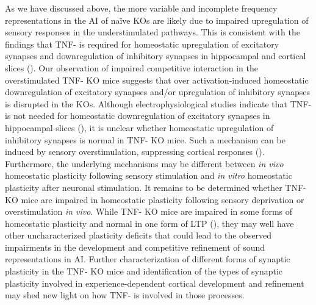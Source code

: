 As we have discussed above, the more variable and incomplete frequency representations in the AI of na\"ive KOs are likely due to impaired upregulation of sensory responses in the understimulated pathways. This is consistent with the findings that TNF-\textalpha{} is required for homeostatic upregulation of excitatory synapses and downregulation of inhibitory synapses in hippocampal and cortical slices (\cite{Stellwagen2006, Kaneko2008}). Our observation of impaired competitive interaction in the overstimulated TNF-\textalpha{} KO mice suggests that over activation-induced homeostatic downregulation of excitatory synapses and/or upregulation of inhibitory synapses is disrupted in the KOs. Although electrophysiological studies indicate that TNF-\textalpha{} is not needed for homeostatic downregulation of excitatory synapses in hippocampal slices (\cite{Stellwagen2006}), it is unclear whether homeostatic upregulation of inhibitory synapses is normal in TNF-\textalpha{} KO mice. Such a mechanism can be induced by sensory overstimulation, suppressing cortical responses (\cite{Knott2002}). Furthermore, the underlying mechanisms may be different between \textit{in vivo} homeostatic plasticity following sensory stimulation and \textit{in vitro} homeostatic plasticity after neuronal stimulation. It remains to be determined whether TNF-\textalpha{} KO mice are impaired in homeostatic plasticity following sensory deprivation or overstimulation \textit{in vivo}. While TNF-\textalpha{} KO mice are impaired in some forms of homeostatic plasticity and normal in one form of LTP (\cite{Stellwagen2006, Kaneko2008}), they may well have other uncharacterized plasticity deficits that could lead to the observed impairments in the development and competitive refinement of sound representations in AI. Further characterization of different forms of synaptic plasticity in the TNF-\textalpha{} KO mice and identification of the types of synaptic plasticity involved in experience-dependent cortical development and refinement may shed new light on how TNF-\textalpha{} is involved in those processes.

